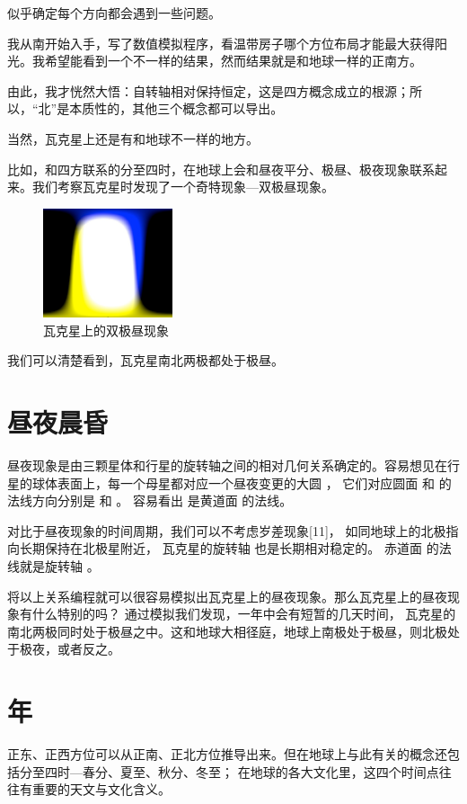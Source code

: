\documentclass[a4paper,10.5pt]{book}
\begin{document}
似乎确定每个方向都会遇到一些问题。

我从南开始入手，写了数值模拟程序，看温带房子哪个方位布局才能最大获得阳光。我希望能看到一个不一样的结果，然而结果就是和地球一样的正南方。

由此，我才恍然大悟：自转轴相对保持恒定，这是四方概念成立的根源；所以，“北”是本质性的，其他三个概念都可以导出。

当然，瓦克星上还是有和地球不一样的地方。

比如，和四方联系的分至四时，在地球上会和昼夜平分、极昼、极夜现象联系起来。我们考察瓦克星时发现了一个奇特现象—双极昼现象。

\begin{figure}[ht]
\centering
\includegraphics[width=1.5in]{images/4_02-day-night.png}
\caption{瓦克星上的双极昼现象}
\end{figure}

我们可以清楚看到，瓦克星南北两极都处于极昼。

\section{昼夜晨昏}

昼夜现象是由三颗星体和行星的旋转轴之间的相对几何关系确定的。容易想见在行星的球体表面上，每一个母星都对应一个昼夜变更的大圆 ，
它们对应圆面   和   的法线方向分别是    和   。 容易看出   是黄道面   的法线。

对比于昼夜现象的时间周期，我们可以不考虑岁差现象[11]， 如同地球上的北极指向长期保持在北极星附近， 瓦克星的旋转轴  也是长期相对稳定的。
赤道面   的法线就是旋转轴  。

将以上关系编程就可以很容易模拟出瓦克星上的昼夜现象。那么瓦克星上的昼夜现象有什么特别的吗？ 通过模拟我们发现，一年中会有短暂的几天时间，
瓦克星的南北两极同时处于极昼之中。这和地球大相径庭，地球上南极处于极昼，则北极处于极夜，或者反之。

\section{年}

正东、正西方位可以从正南、正北方位推导出来。但在地球上与此有关的概念还包括分至四时—春分、夏至、秋分、冬至；
在地球的各大文化里，这四个时间点往往有重要的天文与文化含义。
\end{document}
